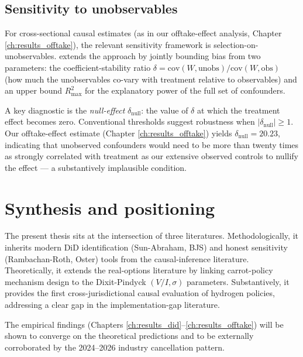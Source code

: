 \subsection{Sensitivity to unobservables}

For cross-sectional causal estimates (as in our offtake-effect analysis, Chapter \ref{ch:results_offtake}), the relevant sensitivity framework is selection-on-unobservables. \cite{oster2019unobservable} extends the \cite{altonji2005selection} approach by jointly bounding bias from two parameters: the coefficient-stability ratio $\delta = \text{cov}(W, \text{unobs}) / \text{cov}(W, \text{obs})$ (how much the unobservables co-vary with treatment relative to observables) and an upper bound $R^2_{\max}$ for the explanatory power of the full set of confounders.

A key diagnostic is the \emph{null-effect} $\delta_{\text{null}}$: the value of $\delta$ at which the treatment effect becomes zero. Conventional thresholds suggest robustness when $|\delta_{\text{null}}| \geq 1$. Our offtake-effect estimate (Chapter \ref{ch:results_offtake}) yields $\delta_{\text{null}} = 20.23$, indicating that unobserved confounders would need to be more than twenty times as strongly correlated with treatment as our extensive observed controls to nullify the effect --- a substantively implausible condition.

\section{Synthesis and positioning}

The present thesis sits at the intersection of three literatures. Methodologically, it inherits modern DiD identification (Sun-Abraham, BJS) and honest sensitivity (Rambachan-Roth, Oster) tools from the causal-inference literature. Theoretically, it extends the real-options literature by linking carrot-policy mechanism design to the Dixit-Pindyck $(V/I, \sigma)$ parameters. Substantively, it provides the first cross-jurisdictional causal evaluation of hydrogen policies, addressing a clear gap in the implementation-gap literature.

The empirical findings (Chapters \ref{ch:results_did}--\ref{ch:results_offtake}) will be shown to converge on the theoretical predictions and to be externally corroborated by the 2024--2026 industry cancellation pattern.
